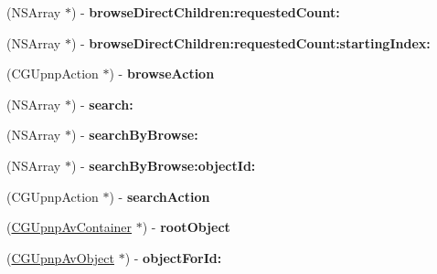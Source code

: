 \begin{DoxyCompactItemize}
\item 
\hypertarget{interface_c_g_upnp_av_server_af0c49bdf981f26d42fc56e2b4784aef9}{(N\-S\-Array $\ast$) -\/ {\bfseries browse\-Direct\-Children\-:requested\-Count\-:}}\label{interface_c_g_upnp_av_server_af0c49bdf981f26d42fc56e2b4784aef9}

\item 
\hypertarget{interface_c_g_upnp_av_server_ab64843075cbb439fa33e610afa0a2ffa}{(N\-S\-Array $\ast$) -\/ {\bfseries browse\-Direct\-Children\-:requested\-Count\-:starting\-Index\-:}}\label{interface_c_g_upnp_av_server_ab64843075cbb439fa33e610afa0a2ffa}

\item 
\hypertarget{interface_c_g_upnp_av_server_a9f05b0dcb6b766bd02635bac06460e2b}{(C\-G\-Upnp\-Action $\ast$) -\/ {\bfseries browse\-Action}}\label{interface_c_g_upnp_av_server_a9f05b0dcb6b766bd02635bac06460e2b}

\item 
\hypertarget{interface_c_g_upnp_av_server_a35b29edc6a7cde2e13a4d11ce11b309a}{(N\-S\-Array $\ast$) -\/ {\bfseries search\-:}}\label{interface_c_g_upnp_av_server_a35b29edc6a7cde2e13a4d11ce11b309a}

\item 
\hypertarget{interface_c_g_upnp_av_server_a9580975ccd1ec46e03894cd8cdc1ea43}{(N\-S\-Array $\ast$) -\/ {\bfseries search\-By\-Browse\-:}}\label{interface_c_g_upnp_av_server_a9580975ccd1ec46e03894cd8cdc1ea43}

\item 
\hypertarget{interface_c_g_upnp_av_server_a1e87d0be0774b8b0c59ad5775195aa70}{(N\-S\-Array $\ast$) -\/ {\bfseries search\-By\-Browse\-:object\-Id\-:}}\label{interface_c_g_upnp_av_server_a1e87d0be0774b8b0c59ad5775195aa70}

\item 
\hypertarget{interface_c_g_upnp_av_server_ad5bb6cd967974d728b7b984ee0576308}{(C\-G\-Upnp\-Action $\ast$) -\/ {\bfseries search\-Action}}\label{interface_c_g_upnp_av_server_ad5bb6cd967974d728b7b984ee0576308}

\item 
\hypertarget{interface_c_g_upnp_av_server_a837146851df3bed9230b78d4bdbbf83d}{(\hyperlink{interface_c_g_upnp_av_container}{C\-G\-Upnp\-Av\-Container} $\ast$) -\/ {\bfseries root\-Object}}\label{interface_c_g_upnp_av_server_a837146851df3bed9230b78d4bdbbf83d}

\item 
\hypertarget{interface_c_g_upnp_av_server_a1c4fa2f2255492787a9de8ad9e617318}{(\hyperlink{interface_c_g_upnp_av_object}{C\-G\-Upnp\-Av\-Object} $\ast$) -\/ {\bfseries object\-For\-Id\-:}}\label{interface_c_g_upnp_av_server_a1c4fa2f2255492787a9de8ad9e617318}


\end{DoxyCompactItemize}
